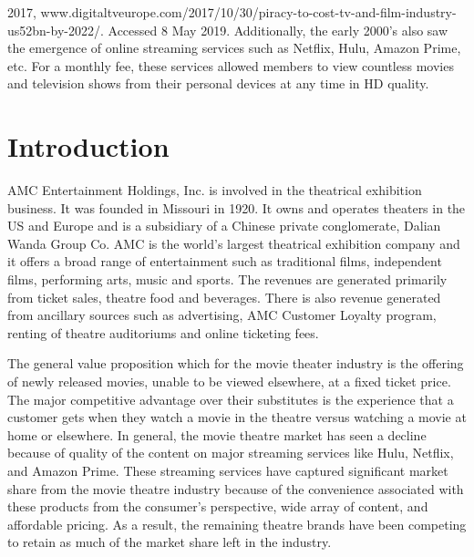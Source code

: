 \documentclass[12pt]{article}
\begin{document}
{     2017, www.digitaltveurope.com/2017/10/30/piracy-to-cost-tv-and-film-industry-us52bn-by-2022/. 
     Accessed 8 May 2019. } Additionally, the early 2000’s also saw the emergence of online streaming services such as Netflix, Hulu, Amazon Prime, etc. For a monthly fee, these services allowed members to view countless movies and television shows from their personal devices at any time in HD quality. 

\section{Introduction}






AMC Entertainment Holdings, Inc. is involved in the theatrical exhibition business. It was founded in Missouri in 1920. It owns and operates theaters in the US and Europe and is a subsidiary of a Chinese private conglomerate, Dalian Wanda Group Co. AMC is the world’s largest theatrical exhibition company and it offers a broad range of entertainment such as traditional films, independent films, performing arts, music and sports. The revenues are generated primarily from ticket sales, theatre food and beverages. There is also revenue generated from ancillary sources such as advertising, AMC Customer Loyalty program, renting of theatre auditoriums and online ticketing fees.

The general value proposition which for the movie theater industry is the offering of newly released movies, unable to be viewed elsewhere, at a fixed ticket price. The major competitive advantage over their substitutes is the experience that a customer gets when they watch a movie in the theatre versus watching a movie at home or elsewhere. In general, the movie theatre market has seen a decline because of quality of the content on major streaming services like Hulu, Netflix, and Amazon Prime. These streaming services have captured significant market share from the movie theatre industry because of the convenience associated with these products from the consumer’s perspective, wide array of content, and affordable pricing. As a result, the remaining theatre brands have been competing to retain as much of the market share left in the industry.
\end{document}
